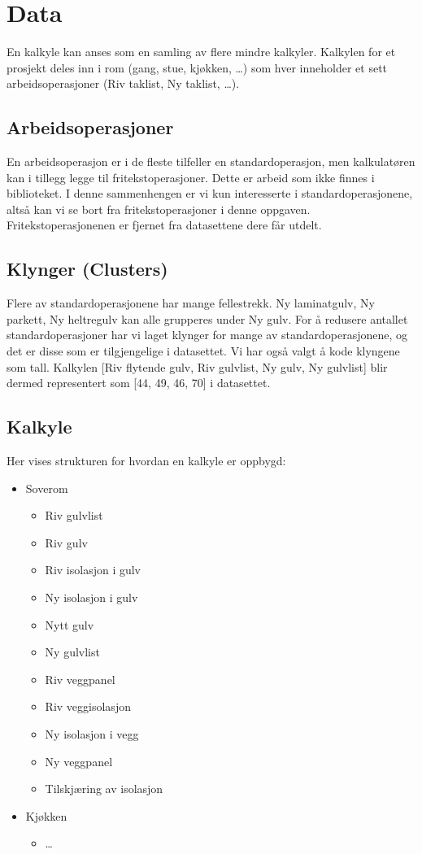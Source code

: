 \documentclass[a4paper]{article}
\begin{document}
\section{Data}
En kalkyle kan anses som en samling av flere mindre kalkyler. Kalkylen for et prosjekt deles inn i rom (gang, stue, kjøkken, \dots) som hver inneholder et sett arbeidsoperasjoner (Riv taklist, Ny taklist, \dots).

\subsection{Arbeidsoperasjoner}
En arbeidsoperasjon er i de fleste tilfeller en standardoperasjon, men kalkulatøren kan i tillegg legge til fritekstoperasjoner. Dette er arbeid som ikke finnes i biblioteket. I denne sammenhengen er vi kun interesserte i standardoperasjonene, altså kan vi se bort fra fritekstoperasjoner i denne oppgaven. Fritekstoperasjonenen er fjernet fra datasettene dere får utdelt.

\subsection{Klynger (Clusters)}
Flere av standardoperasjonene har mange fellestrekk. Ny laminatgulv, Ny parkett, Ny heltregulv kan alle grupperes under Ny gulv. For å redusere antallet standardoperasjoner har vi laget klynger for mange av standardoperasjonene, og det er disse som er tilgjengelige i datasettet. Vi har også valgt å kode klyngene som tall. Kalkylen [Riv flytende gulv, Riv gulvlist, Ny gulv, Ny gulvlist] blir dermed representert som [44, 49, 46, 70] i datasettet.

\subsection{Kalkyle}
Her vises strukturen for hvordan en kalkyle er oppbygd:
\begin{itemize}
\item Soverom
  \begin{itemize}
  \item Riv gulvlist
  \item Riv gulv
  \item Riv isolasjon i gulv
  \item Ny isolasjon i gulv
  \item Nytt gulv
  \item Ny gulvlist
  \item Riv veggpanel
  \item Riv veggisolasjon
  \item Ny isolasjon i vegg
  \item Ny veggpanel
  \item Tilskjæring av isolasjon
  \end{itemize}
\item Kjøkken
  \begin{itemize}
  \item \dots
  \end{itemize}
\end{itemize}
\end{document}
